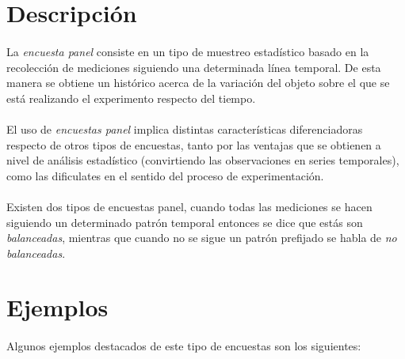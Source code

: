 \documentclass{article}
\begin{document}
	\maketitle
  \thispagestyle{empty}



	\section{Descripción}
	\label{sec:description}

    \paragraph{}
    La \emph{encuesta panel} consiste en un tipo de muestreo estadístico basado en la recolección de mediciones siguiendo una determinada línea temporal. De esta manera se obtiene un histórico acerca de la variación del objeto sobre el que se está realizando el experimento respecto del tiempo.

    \paragraph{}
    El uso de \emph{encuestas panel} implica distintas características diferenciadoras respecto de otros tipos de encuestas, tanto por las ventajas que se obtienen a nivel de análisis estadístico (convirtiendo las observaciones en series temporales), como las dificulates en el sentido del proceso de experimentación.

    \paragraph{}
    Existen dos tipos de encuestas panel, cuando todas las mediciones se hacen siguiendo un determinado patrón temporal entonces se dice que estás son \emph{balanceadas}, mientras que cuando no se sigue un patrón prefijado se habla de \emph{no balanceadas}.

  \section{Ejemplos}
  \label{sec:examples}

    \paragraph{}
    Algunos ejemplos destacados de este tipo de encuestas son los siguientes:
\end{document}
